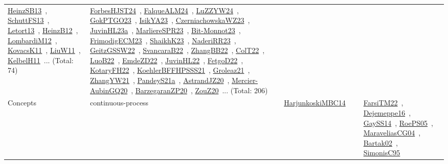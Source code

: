 {\begin{longtable}{lp{3cm}>{\raggedright\arraybackslash}p{6cm}>{\raggedright\arraybackslash}p{6cm}>{\raggedright\arraybackslash}p{8cm}}
\href{../works/HeinzSB13.pdf}{HeinzSB13}~\cite{HeinzSB13}, \href{../works/SchuttFS13.pdf}{SchuttFS13}~\cite{SchuttFS13}, \href{../works/Letort13.pdf}{Letort13}~\cite{Letort13}, \href{../works/HeinzB12.pdf}{HeinzB12}~\cite{HeinzB12}, \href{../works/LombardiM12.pdf}{LombardiM12}~\cite{LombardiM12}, \href{../works/KovacsK11.pdf}{KovacsK11}~\cite{KovacsK11}, \href{../works/LiuW11.pdf}{LiuW11}~\cite{LiuW11}, \href{../works/KelbelH11.pdf}{KelbelH11}~\cite{KelbelH11}... (Total: 74) & \href{../works/ForbesHJST24.pdf}{ForbesHJST24}~\cite{ForbesHJST24}, \href{../works/FalqueALM24.pdf}{FalqueALM24}~\cite{FalqueALM24}, \href{../works/LuZZYW24.pdf}{LuZZYW24}~\cite{LuZZYW24}, \href{../works/GokPTGO23.pdf}{GokPTGO23}~\cite{GokPTGO23}, \href{../works/IsikYA23.pdf}{IsikYA23}~\cite{IsikYA23}, \href{../works/CzerniachowskaWZ23.pdf}{CzerniachowskaWZ23}~\cite{CzerniachowskaWZ23}, \href{../works/JuvinHL23a.pdf}{JuvinHL23a}~\cite{JuvinHL23a}, \href{../works/MarliereSPR23.pdf}{MarliereSPR23}~\cite{MarliereSPR23}, \href{../works/Bit-Monnot23.pdf}{Bit-Monnot23}~\cite{Bit-Monnot23}, \href{../works/FrimodigECM23.pdf}{FrimodigECM23}~\cite{FrimodigECM23}, \href{../works/ShaikhK23.pdf}{ShaikhK23}~\cite{ShaikhK23}, \href{../works/NaderiRR23.pdf}{NaderiRR23}~\cite{NaderiRR23}, \href{../works/GeitzGSSW22.pdf}{GeitzGSSW22}~\cite{GeitzGSSW22}, \href{../works/SvancaraB22.pdf}{SvancaraB22}~\cite{SvancaraB22}, \href{../works/ZhangBB22.pdf}{ZhangBB22}~\cite{ZhangBB22}, \href{../works/ColT22.pdf}{ColT22}~\cite{ColT22}, \href{../works/LuoB22.pdf}{LuoB22}~\cite{LuoB22}, \href{../works/EmdeZD22.pdf}{EmdeZD22}~\cite{EmdeZD22}, \href{../works/JuvinHL22.pdf}{JuvinHL22}~\cite{JuvinHL22}, \href{../works/FetgoD22.pdf}{FetgoD22}~\cite{FetgoD22}, \href{../works/KotaryFH22.pdf}{KotaryFH22}~\cite{KotaryFH22}, \href{../works/KoehlerBFFHPSSS21.pdf}{KoehlerBFFHPSSS21}~\cite{KoehlerBFFHPSSS21}, \href{../works/Groleaz21.pdf}{Groleaz21}~\cite{Groleaz21}, \href{../works/ZhangYW21.pdf}{ZhangYW21}~\cite{ZhangYW21}, \href{../works/PandeyS21a.pdf}{PandeyS21a}~\cite{PandeyS21a}, \href{../works/AstrandJZ20.pdf}{AstrandJZ20}~\cite{AstrandJZ20}, \href{../works/Mercier-AubinGQ20.pdf}{Mercier-AubinGQ20}~\cite{Mercier-AubinGQ20}, \href{../works/BarzegaranZP20.pdf}{BarzegaranZP20}~\cite{BarzegaranZP20}, \href{../works/ZouZ20.pdf}{ZouZ20}~\cite{ZouZ20}... (Total: 206)\\
\index{continuous-process}\index{Concepts!continuous-process}Concepts & continuous-process & \href{../works/HarjunkoskiMBC14.pdf}{HarjunkoskiMBC14}~\cite{HarjunkoskiMBC14} &  & \href{../works/FarsiTM22.pdf}{FarsiTM22}~\cite{FarsiTM22}, \href{../works/Dejemeppe16.pdf}{Dejemeppe16}~\cite{Dejemeppe16}, \href{../works/GaySS14.pdf}{GaySS14}~\cite{GaySS14}, \href{../works/RoePS05.pdf}{RoePS05}~\cite{RoePS05}, \href{../works/MaraveliasCG04.pdf}{MaraveliasCG04}~\cite{MaraveliasCG04}, \href{../works/Bartak02.pdf}{Bartak02}~\cite{Bartak02}, \href{../works/SimonisC95.pdf}{SimonisC95}~\cite{SimonisC95}\\

\end{longtable}}
